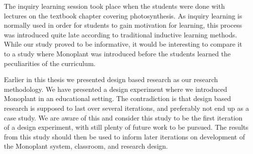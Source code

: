 The inquiry learning session took place when the students were done with lectures on the textbook chapter covering photosynthesis. As inquiry learning is normally used in order for students to gain motivation for learning, this process was introduced quite late according to traditional inductive learning methods. While our study proved to be informative, it would be interesting to compare it to a study where Monoplant was introduced before the students learned the peculiarities of the curriculum.

Earlier in this thesis we presented design based research as our research methodology. We have presented a design experiment where we introduced Monoplant in an educational setting. The contradiction is that design based research is supposed to last over several iterations, and preferably not end up as a case study. We are aware of this and consider this study to be the first iteration of a design experiment, with still plenty of future work to be pursued. The results from this study should then be used to inform later iterations on development of the Monoplant system, classroom, and research design.
